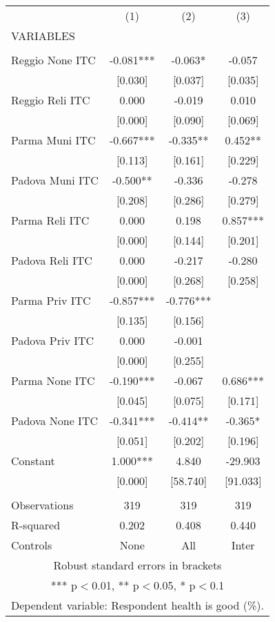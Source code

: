 \begin{tabular}{lccc} \hline
 & (1) & (2) & (3) \\
VARIABLES &  &  &  \\ \hline
 &  &  &  \\
Reggio None ITC & -0.081*** & -0.063* & -0.057 \\
 & [0.030] & [0.037] & [0.035] \\
Reggio Reli ITC & 0.000 & -0.019 & 0.010 \\
 & [0.000] & [0.090] & [0.069] \\
Parma Muni ITC & -0.667*** & -0.335** & 0.452** \\
 & [0.113] & [0.161] & [0.229] \\
Padova Muni ITC & -0.500** & -0.336 & -0.278 \\
 & [0.208] & [0.286] & [0.279] \\
Parma Reli ITC & 0.000 & 0.198 & 0.857*** \\
 & [0.000] & [0.144] & [0.201] \\
Padova Reli ITC & 0.000 & -0.217 & -0.280 \\
 & [0.000] & [0.268] & [0.258] \\
Parma Priv ITC & -0.857*** & -0.776*** &  \\
 & [0.135] & [0.156] &  \\
Padova Priv ITC & 0.000 & -0.001 &  \\
 & [0.000] & [0.255] &  \\
Parma None ITC & -0.190*** & -0.067 & 0.686*** \\
 & [0.045] & [0.075] & [0.171] \\
Padova None ITC & -0.341*** & -0.414** & -0.365* \\
 & [0.051] & [0.202] & [0.196] \\
Constant & 1.000*** & 4.840 & -29.903 \\
 & [0.000] & [58.740] & [91.033] \\
 &  &  &  \\
Observations & 319 & 319 & 319 \\
R-squared & 0.202 & 0.408 & 0.440 \\
 Controls & None & All & Inter \\ \hline
\multicolumn{4}{c}{ Robust standard errors in brackets} \\
\multicolumn{4}{c}{ *** p$<$0.01, ** p$<$0.05, * p$<$0.1} \\
\multicolumn{4}{c}{ Dependent variable: Respondent health is good (\%).} \\
\end{tabular}
